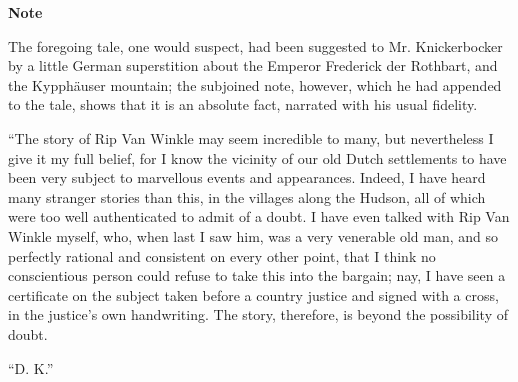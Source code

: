\clearpage
\textbf{Note\\}

The foregoing tale, one would suspect, had been suggested to Mr. Knickerbocker by a little German superstition about the Emperor Frederick der Rothbart, and the Kypphäuser mountain; the subjoined note, however, which he had appended to the tale, shows that it is an absolute fact, narrated with his usual fidelity.

“The story of Rip Van Winkle may seem incredible to many, but nevertheless I give it my full belief, for I know the vicinity of our old Dutch settlements to have been very subject to marvellous events and appearances. Indeed, I have heard many stranger stories than this, in the villages along the Hudson, all of which were too well authenticated to admit of a doubt. I have even talked with Rip Van Winkle myself, who, when last I saw him, was a very venerable old man, and so perfectly rational and consistent on every other point, that I think no conscientious person could refuse to take this into the bargain; nay, I have seen a certificate on the subject taken before a country justice and signed with a cross, in the justice’s own handwriting. The story, therefore, is beyond the possibility of doubt.

“D. K.”


